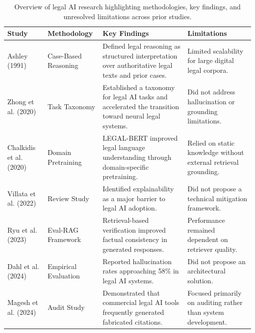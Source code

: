 \documentclass[11pt]{article}
\begin{document}
\vspace*{1cm}
\setcounter{table}{0}

\begin{table}[H]
\caption{Overview of legal AI research highlighting methodologies, key findings, and unresolved limitations across prior studies.}
\label{tab:litreview}
\centering
\footnotesize
\begin{tabularx}{\textwidth}{|>{\raggedright\arraybackslash}p{2.5cm}|>{\raggedright\arraybackslash}p{3.0cm}|>{\raggedright\arraybackslash}X|>{\raggedright\arraybackslash}X|}
\hline
\rowcolor{black!15}
\textbf{Study} & \textbf{Methodology} & \textbf{Key Findings} & \textbf{Limitations} \\
\hline

Ashley (1991) & Case-Based Reasoning & Defined legal reasoning as structured interpretation over authoritative legal texts and prior cases. & Limited scalability for large digital legal corpora. \\
\hline

Zhong et al. (2020) & Task Taxonomy & Established a taxonomy for legal AI tasks and accelerated the transition toward neural legal systems. & Did not address hallucination or grounding limitations. \\
\hline

Chalkidis et al. (2020) & Domain Pretraining & LEGAL-BERT improved legal language understanding through domain-specific pretraining. & Relied on static knowledge without external retrieval grounding. \\
\hline

Villata et al. (2022) & Review Study & Identified explainability as a major barrier to legal AI adoption. & Did not propose a technical mitigation framework. \\
\hline

Ryu et al. (2023) & Eval-RAG Framework & Retrieval-based verification improved factual consistency in generated responses. & Performance remained dependent on retriever quality. \\
\hline

Dahl et al. (2024) & Empirical Evaluation & Reported hallucination rates approaching 58\% in legal AI systems. & Did not propose an architectural solution. \\
\hline

Magesh et al. (2024) & Audit Study & Demonstrated that commercial legal AI tools frequently generated fabricated citations. & Focused primarily on auditing rather than system development. \\
\hline


\end{tabularx}
\end{table}
\end{document}
